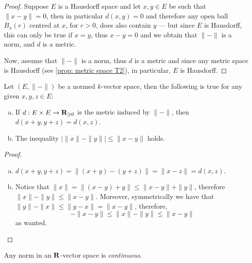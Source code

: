 \begin{proof}
    Suppose \(E\) is a Hausdorff space and let \(x, y \in E\) be such that \(\| x -
    y \| = 0\), then in particular \(d(x, y) = 0\) and therefore any open ball
    \(B_x(r)\) centred at \(x\), for \(r > 0\), does also contain \(y\) --- but
    since \(E\) is Hausdorff, this can only be true if \(x = y\), thus \(x - y = 0\)
    and we obtain that \(\| - \|\) is a norm, and \(d\) is a metric.

    Now, assume that \(\| - \|\) is a norm, thus \(d\) is a metric and since any
    metric space is Hausdorff (see \cref{prop: metric space T2}), in particular,
    \(E\) is Hausdorff.
\end{proof}

\begin{lemma}
    \label{lem:norm-is-continuous}
    Let \((E, \| - \|)\) be a normed \(k\)-vector space, then the following is true
    for any given \(x, y, z \in E\):
    \begin{enumerate}[(a)]\setlength\itemsep{0em}
        \item If \(d: E \times E \to \mathbf{R}_{\geqslant 0}\) is the metric induced by \(\| - \|\),
              then \(d(x + y, y + z) = d(x, z)\).

        \item The inequality \(\big| \| x \| - \| y \| \big| \leq \| x - y \|\) holds.
    \end{enumerate}
\end{lemma}

\begin{proof}
    \begin{enumerate}[(a)]\setlength\itemsep{0em}
        \item \(d(x + y, y + z) = \| (x + y) - (y + z)\| = \| x - z \| = d(x, z)\).

        \item Notice that \(\| x \| = \| (x - y) + y \| \leq \| x - y \| + \| y \|\),
              therefore \(\| x \| - \| y \| \leq \| x - y \|\). Moreover, symmetrically we
              have that \(\| y \| - \| x \| \leq \| y - x \| = \| x - y \|\), therefore,
              \[
                  - \| x - y \| \leq \| x \| - \| y \| \leq \| x - y \|
              \]
              as wanted.
    \end{enumerate}
\end{proof}

\begin{proposition}
    \label{prop:norm-is-continuous}
    Any norm in an \(\mathbf{R}\)-vector space is \emph{continuous}.
\end{proposition}

